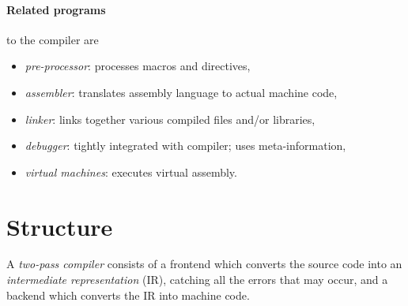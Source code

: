 \documentclass{article}
\begin{document}
\paragraph{Related programs} to the compiler are
\begin{itemize}
    \item \emph{pre-processor}: processes macros and directives,
    \item \emph{assembler}: translates assembly language to actual machine code,
    \item \emph{linker}: links together various compiled files and/or libraries,
    \item \emph{debugger}: tightly integrated with compiler; uses meta-information,
    \item \emph{virtual machines}: executes virtual assembly.
\end{itemize}

\section{Structure}


\begin{definition}
    A \emph{two-pass compiler} consists of a frontend which converts the source code
    into an \emph{intermediate representation} (IR), catching all the errors that may occur,
    and a backend which converts the IR into machine code.

    \begin{center}
    \end{center}
\end{definition}
\end{document}
